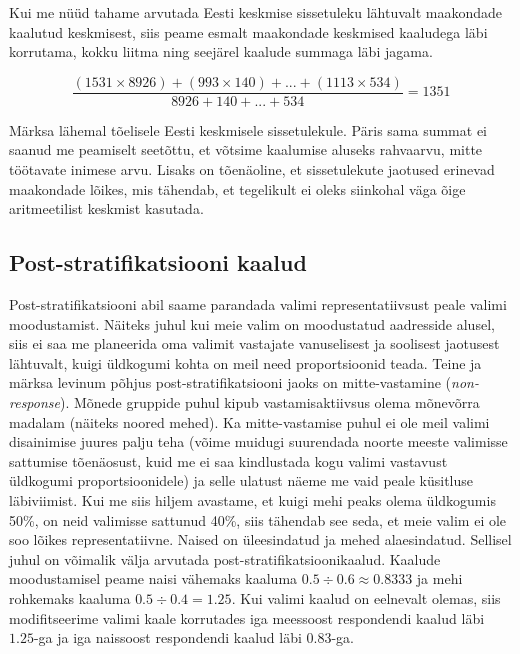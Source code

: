 \documentclass[
]{book}
\begin{document}
Kui me nüüd tahame arvutada Eesti keskmise sissetuleku lähtuvalt maakondade kaalutud keskmisest, siis peame esmalt maakondade keskmised kaaludega läbi korrutama, kokku liitma ning seejärel kaalude summaga läbi jagama.

\[\frac{(1531 \times 8926) + (993 \times 140) + ... + (1113 \times 534)}{8926 + 140 + ... + 534} = 1351\]

Märksa lähemal tõelisele Eesti keskmisele sissetulekule. Päris sama summat ei saanud me peamiselt seetõttu, et võtsime kaalumise aluseks rahvaarvu, mitte töötavate inimese arvu. Lisaks on tõenäoline, et sissetulekute jaotused erinevad maakondade lõikes, mis tähendab, et tegelikult ei oleks siinkohal väga õige aritmeetilist keskmist kasutada.

\hypertarget{post-stratifikatsiooni-kaalud}{%
\subsection{Post-stratifikatsiooni kaalud}\label{post-stratifikatsiooni-kaalud}}

Post-stratifikatsiooni abil saame parandada valimi representatiivsust peale valimi moodustamist. Näiteks juhul kui meie valim on moodustatud aadresside alusel, siis ei saa me planeerida oma valimit vastajate vanuselisest ja soolisest jaotusest lähtuvalt, kuigi üldkogumi kohta on meil need proportsioonid teada. Teine ja märksa levinum põhjus post-stratifikatsiooni jaoks on mitte-vastamine (\emph{non-response}). Mõnede gruppide puhul kipub vastamisaktiivsus olema mõnevõrra madalam (näiteks noored mehed). Ka mitte-vastamise puhul ei ole meil valimi disainimise juures palju teha (võime muidugi suurendada noorte meeste valimisse sattumise tõenäosust, kuid me ei saa kindlustada kogu valimi vastavust üldkogumi proportsioonidele) ja selle ulatust näeme me vaid peale küsitluse läbiviimist. Kui me siis hiljem avastame, et kuigi mehi peaks olema üldkogumis 50\%, on neid valimisse sattunud 40\%, siis tähendab see seda, et meie valim ei ole soo lõikes representatiivne. Naised on üleesindatud ja mehed alaesindatud. Sellisel juhul on võimalik välja arvutada post-stratifikatsioonikaalud. Kaalude moodustamisel peame naisi vähemaks kaaluma \(0.5 \div 0.6 \approx 0.8333\) ja mehi rohkemaks kaaluma \(0.5 \div 0.4 = 1.25\). Kui valimi kaalud on eelnevalt olemas, siis modifitseerime valimi kaale korrutades iga meessoost respondendi kaalud läbi \(1.25\)-ga ja iga naissoost respondendi kaalud läbi \(0.83\)-ga.
\end{document}
